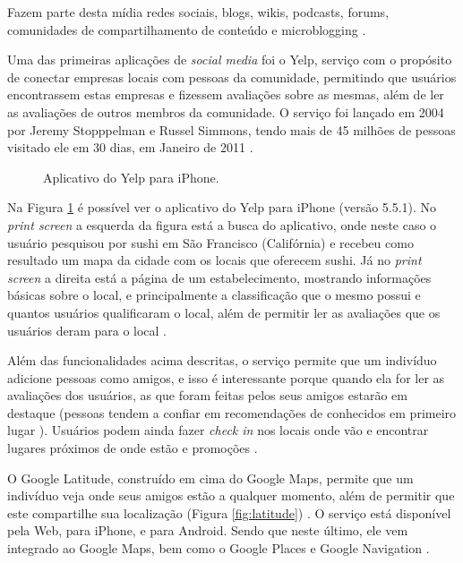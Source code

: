 \documentclass[diss]{template/setrem}
\begin{document}
Fazem parte desta mídia redes sociais, blogs, wikis, podcasts, forums, comunidades de compartilhamento de conteúdo e microblogging \citep{Mayfield2008}.

Uma das primeiras aplicações de \emph{social media} foi o Yelp, serviço com o propósito de conectar empresas locais com pessoas da comunidade, permitindo que usuários encontrassem estas empresas e fizessem avaliações sobre as mesmas, além de ler as avaliações de outros membros da comunidade. O serviço foi lançado em 2004 por Jeremy Stopppelman e Russel Simmons, tendo mais de 45 milhões de pessoas visitado ele em 30 dias, em Janeiro de 2011 \citep{Mayfield2008}.

\begin{figure}[!h]
    \caption{Aplicativo do Yelp para iPhone.}
    \label{fig:yelp}
\end{figure}

Na Figura \ref{fig:yelp} é possível ver o aplicativo do Yelp para iPhone (versão 5.5.1). No \emph{print screen} a esquerda da figura está a busca do aplicativo, onde neste caso o usuário pesquisou por sushi em São Francisco (Califórnia) e recebeu como resultado um mapa da cidade com os locais que oferecem sushi. Já no \emph{print screen} a direita está a página de um estabelecimento, mostrando informações básicas sobre o local, e principalmente a classificação que o mesmo possui e quantos usuários qualificaram o local, além de permitir ler as avaliações que os usuários deram para o local \citep{Yelp2012}.

Além das funcionalidades acima descritas, o serviço permite que um indivíduo adicione pessoas como amigos, e isso é interessante porque quando ela for ler as avaliações dos usuários, as que foram feitas pelos seus amigos estarão em destaque (pessoas tendem a confiar em recomendações de conhecidos em primeiro lugar \citep{Nielsen2009}). Usuários podem ainda fazer \emph{check in} nos locais onde vão e encontrar lugares próximos de onde estão e promoções \citep{Yelp2012}.

O Google Latitude, construído em cima do Google Maps, permite que um indivíduo veja onde seus amigos estão a qualquer momento, além de permitir que este compartilhe sua localização (Figura \ref{fig:latitude}) \citep{Holdener2011}. O serviço está disponível pela Web, para iPhone, e para Android. Sendo que neste último, ele vem integrado ao Google Maps, bem como o Google Places e Google Navigation \citep{AndroidMarket2012}.
\end{document}
